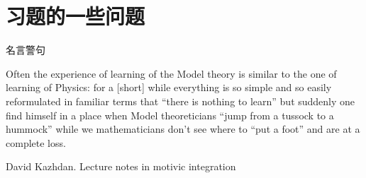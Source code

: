 \documentclass[presentation]{beamer}
\begin{document}
\section{习题的一些问题}
\label{sec:org33fa2cc}
\begin{frame}[label={sec:org0d95708}]{名言警句}
    \begin{displayquote}
Often the experience of learning of the Model theory is similar to the one of learning of Physics: for a [short] while everything is so simple and so easily reformulated in familiar terms that “there is nothing to learn” but suddenly one find himself in a place when Model theoreticians “jump from a tussock to a hummock” while we mathematicians don't see where to “put a foot” and are at a complete loss.\par
\hfill David Kazhdan. Lecture notes in motivic integration
    \end{displayquote}
\end{frame}
\end{document}
